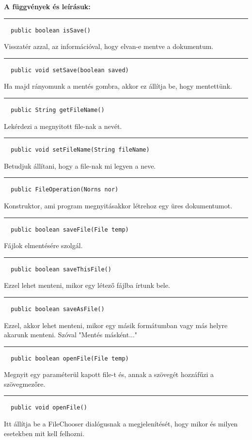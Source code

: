 \documentclass[12pt]{article}
\newcommand{\fuggveny}{\textbf{A függvények és leírásuk: \\}}
\newcommand{\vonal}{\noindent\rule{\textwidth}{1pt}}
\begin{document}
\fuggveny
\vonal
\begin{lstlisting}
  public boolean isSave()
\end{lstlisting}
Visszatér azzal, az információval, hogy elvan-e mentve a dokumentum.

\vonal
\begin{lstlisting}
  public void setSave(boolean saved)
\end{lstlisting}
Ha majd rányomunk a mentés gombra, akkor ez állítja be, hogy mentettünk.

\vonal
\begin{lstlisting}
  public String getFileName()
\end{lstlisting}
Lekérdezi a megnyitott file-nak a nevét.

\vonal
\begin{lstlisting}
  public void setFileName(String fileName)
\end{lstlisting}
Betudjuk állítani, hogy a file-nak mi legyen a neve.

\vonal
\begin{lstlisting}
  public FileOperation(Norns nor)
\end{lstlisting}
Konstruktor, ami program megnyitásakkor létrehoz egy üres dokumentumot.

\vonal
\begin{lstlisting}
  public boolean saveFile(File temp)
\end{lstlisting}
Fájlok elmentésére szolgál.

\vonal
\begin{lstlisting}
  public boolean saveThisFile()
\end{lstlisting}
Ezzel lehet menteni, mikor egy létező fájlba írtunk bele.

\vonal
\begin{lstlisting}
  public boolean saveAsFile()
\end{lstlisting}
Ezzel, akkor lehet menteni, mikor egy másik formátumban vagy más helyre
akarunk menteni. Szóval "Mentés másként..."

\vonal
\begin{lstlisting}
  public boolean openFile(File temp)
\end{lstlisting}
Megnyit egy paraméterül kapott file-t és, annak a szövegét hozzáfűzi a szövegmezőre.

\newpage
\vonal
\begin{lstlisting}
  public void openFile()
\end{lstlisting}
Itt állítja be a FileChooser dialógusnak a megjelenítését, hogy mikor és milyen
esetekben mit kell felhozni.
\end{document}
